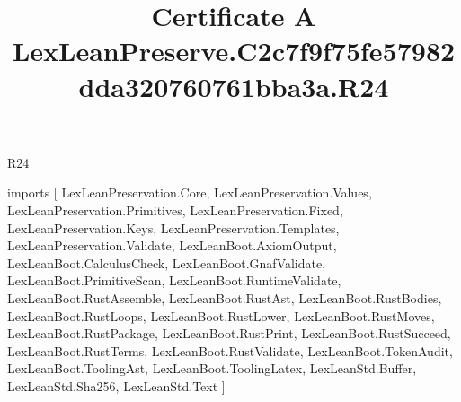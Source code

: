 \begin{lexlean}{R24}
\title{Certificate A LexLeanPreserve.C2c7f9f75fe57982dda320760761bba3a.R24}
\begin{coremodule}
imports [
  LexLeanPreservation.Core,
  LexLeanPreservation.Values,
  LexLeanPreservation.Primitives,
  LexLeanPreservation.Fixed,
  LexLeanPreservation.Keys,
  LexLeanPreservation.Templates,
  LexLeanPreservation.Validate,
  LexLeanBoot.AxiomOutput,
  LexLeanBoot.CalculusCheck,
  LexLeanBoot.GnafValidate,
  LexLeanBoot.PrimitiveScan,
  LexLeanBoot.RuntimeValidate,
  LexLeanBoot.RustAssemble,
  LexLeanBoot.RustAst,
  LexLeanBoot.RustBodies,
  LexLeanBoot.RustLoops,
  LexLeanBoot.RustLower,
  LexLeanBoot.RustMoves,
  LexLeanBoot.RustPackage,
  LexLeanBoot.RustPrint,
  LexLeanBoot.RustSucceed,
  LexLeanBoot.RustTerms,
  LexLeanBoot.RustValidate,
  LexLeanBoot.TokenAudit,
  LexLeanBoot.ToolingAst,
  LexLeanBoot.ToolingLatex,
  LexLeanStd.Buffer,
  LexLeanStd.Sha256,
  LexLeanStd.Text
]


\end{coremodule}
\end{lexlean}
